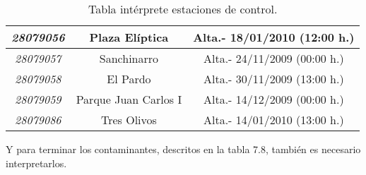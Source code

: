 \begin{table}[H]
\begin{center}
\begin{tabular}{|c|c|c|}
		\textit{28079056} & Plaza Elíptica          & Alta.- 18/01/2010 (12:00 h.)                                                                     \\ \hline
		\textit{28079057} & Sanchinarro             & Alta.- 24/11/2009 (00:00 h.)                                                                     \\ \hline
		\textit{28079058} & El Pardo                & Alta.- 30/11/2009 (13:00 h.)                                                                     \\ \hline
		\textit{28079059} & Parque Juan Carlos I    & Alta.- 14/12/2009 (00:00 h.)                                                                     \\ \hline
		\textit{28079086} & Tres Olivos    & Alta.- 14/01/2010 (13:00 h.)                                                                    \\ \hline
	
\end{tabular}
	\caption{Tabla intérprete estaciones de control.}
	\end{center}	
\end{table}

Y para terminar los contaminantes, descritos en la tabla 7.8, también es necesario interpretarlos.

